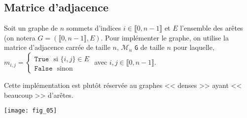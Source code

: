 \subsection{Matrice d'adjacence}
\begin{defi}
Soit un graphe de $n$ sommets d'indices $i \in \llbracket 0, n-1\rrbracket$ et $E$ l'ensemble des arêtes 
(on notera $G=\left( \llbracket 0, n-1\rrbracket,E\right)$. Pour implémenter le graphe, on utilise la matrice d'adjacence carrée de taille $n$, $\mathcal{M}_n$ \texttt{G} de taille $n$ pour laquelle,
$m_{i,j}=\left\{
\begin{array}{l}
\texttt{True } \text{ si } \{i,j\}\in E\\
\texttt{False } \text{ sinon } 
\end{array}
\right.$ avec $i,j\in \llbracket 0, n-1\rrbracket$. 


\end{defi}
\begin{rem}
Cette implémentation est plutôt réservée au graphes << denses >> ayant << beaucoup >> d'arêtes.
\end{rem}




\begin{marginfigure}
\texttt{[image: fig\_05]}
\end{marginfigure}

